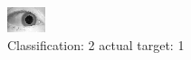 \begin{figure}[h!]
\begin{center}
\includegraphics[width=0.60\columnwidth]{figures/ID1462_class_2_target_1.png}
\end{center}
\caption{ Classification: 2 actual target: 1}
\label{fig:ID1462_class_2_target_1}
\end{figure}
